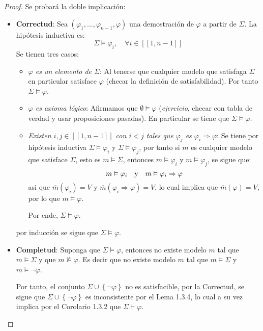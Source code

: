 \documentclass[12pt]{report}
\theoremstyle{largebreak}
\newcommand\natint[1]{\ensuremath{\left[\!\left[ #1\right]\!\right]}}
\begin{document}
    \begin{proof}
        Se probará la doble implicación:
        \begin{itemize}
            \item \textbf{Correctud}: Sea $(\varphi_1,...,\varphi_{ n-1},\varphi)$ una demostración de $\varphi$ a partir de $\Sigma$. La hipótesis inductiva es:
            \begin{equation*}
                \Sigma\vDash\varphi_{ i},\quad\forall i\in\natint{1,n-1}
            \end{equation*}
            Se tienen tres casos:
            \begin{itemize}
                \item \textit{$\varphi$ es un elemento de $\Sigma$}: Al tenerse que cualquier modelo que satisfaga $\Sigma$ en particular satisface $\varphi$ (checar la definición de satisfabilidad). Por tanto $\Sigma\vDash\varphi$.
                \item \textit{$\varphi$ es axioma lógico}: Afirmamos que $\emptyset\vDash\varphi$ (\textit{ejercicio}, checar con tabla de verdad y usar proposiciones pasadas). En particular se tiene que $\Sigma\vDash\varphi$.
                \item \textit{Existen $i,j\in\natint{1,n-1}$ con $i<j$ tales que $\varphi_j$ es $\varphi_i\Rightarrow\varphi$}: Se tiene por hipótesis inductiva $\Sigma\vDash\varphi_i$ y $\Sigma\vDash\varphi_j$, por tanto si $m$ es cualquier modelo que satisface $\Sigma$, esto es $m\vDash\Sigma$, entonces $m\vDash\varphi_i$ y $m\vDash\varphi_j$, se sigue que:
                \begin{equation*}
                    m\vDash\varphi_i\quad\textup{y}\quad m\vDash\varphi_i\Rightarrow\varphi
                \end{equation*}
                asi que $\overline{m}(\varphi_i)=V$ y $\overline{m}(\varphi_i\Rightarrow\varphi)=V$, lo cual implica que $\overline{m}(\varphi)=V$, por lo que $m\vDash\varphi$.

                Por ende, $\Sigma\vDash\varphi$.
            \end{itemize}
            por inducción se sigue que $\Sigma\vDash\varphi$.
            \item \textbf{Completud}: Suponga que $\Sigma\vDash\varphi$, entonces no existe modelo $m$ tal que $m\vDash\Sigma$ y que $m\nvDash\varphi$. Es decir que no existe modelo $m$ tal que $m\vDash\Sigma$ y $m\vDash\neg\varphi$.
            
            Por tanto, el conjunto $\Sigma\cup\left\{\neg\varphi\right\}$ no es satisfacible, por la Correctud, se sigue que $\Sigma\cup\left\{\neg\varphi\right\}$ es inconsistente por el Lema 1.3.4, lo cual a su vez implica por el Corolario 1.3.2 que $\Sigma\vdash\varphi$.
        \end{itemize}
    \end{proof}
\end{document}
